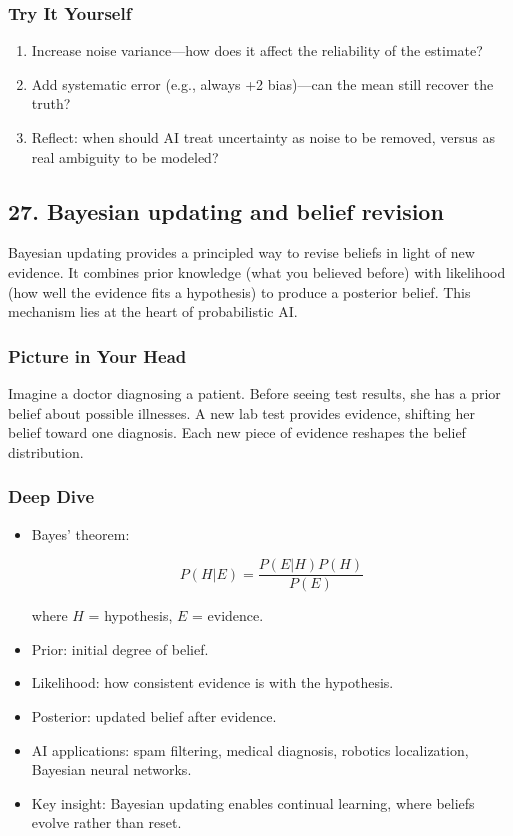 \documentclass[
  letterpaper,
  DIV=11,
  numbers=noendperiod]{scrreprt}
\providecommand{\tightlist}{%
  \setlength{\itemsep}{0pt}\setlength{\parskip}{0pt}}
\begin{document}
\subsubsection{Try It Yourself}\label{try-it-yourself-25}

\begin{enumerate}
\def\labelenumi{\arabic{enumi}.}
\tightlist
\item
  Increase noise variance---how does it affect the reliability of the
  estimate?
\item
  Add systematic error (e.g., always +2 bias)---can the mean still
  recover the truth?
\item
  Reflect: when should AI treat uncertainty as noise to be removed,
  versus as real ambiguity to be modeled?
\end{enumerate}

\subsection{27. Bayesian updating and belief
revision}\label{bayesian-updating-and-belief-revision}

Bayesian updating provides a principled way to revise beliefs in light
of new evidence. It combines prior knowledge (what you believed before)
with likelihood (how well the evidence fits a hypothesis) to produce a
posterior belief. This mechanism lies at the heart of probabilistic AI.

\subsubsection{Picture in Your Head}\label{picture-in-your-head-26}

Imagine a doctor diagnosing a patient. Before seeing test results, she
has a prior belief about possible illnesses. A new lab test provides
evidence, shifting her belief toward one diagnosis. Each new piece of
evidence reshapes the belief distribution.

\subsubsection{Deep Dive}\label{deep-dive-26}

\begin{itemize}
\item
  Bayes' theorem:

  \[
  P(H|E) = \frac{P(E|H) P(H)}{P(E)}
  \]

  where \(H\) = hypothesis, \(E\) = evidence.
\item
  Prior: initial degree of belief.
\item
  Likelihood: how consistent evidence is with the hypothesis.
\item
  Posterior: updated belief after evidence.
\item
  AI applications: spam filtering, medical diagnosis, robotics
  localization, Bayesian neural networks.
\item
  Key insight: Bayesian updating enables continual learning, where
  beliefs evolve rather than reset.
\end{itemize}
\end{document}

